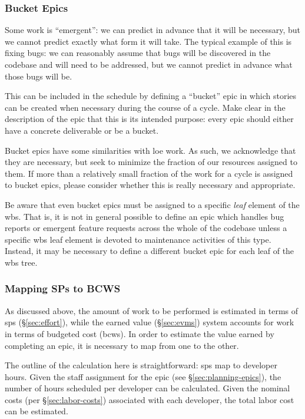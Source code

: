 \subsubsection{Bucket Epics}
\label{sec:bucket}

Some work is ``emergent'': we can predict in advance that it will be necessary, but we cannot predict exactly what form it will take.
The typical example of this is fixing bugs: we can reasonably assume that bugs will be discovered in the codebase and will need to be addressed, but we cannot predict in advance what those bugs will be.

This can be included in the schedule by defining a ``bucket'' \gls{epic} in which stories can be created when necessary during the course of a \gls{cycle}.
Make clear in the description of the \gls{epic} that this is its intended purpose: every \gls{epic} should either have a concrete deliverable or be a bucket.

Bucket \glspl{epic} have some similarities with \gls{loe} work.
As such, we acknowledge that they are necessary, but seek to minimize the fraction of our resources assigned to them.
If more than a relatively small fraction of the work for a \gls{cycle} is assigned to bucket \glspl{epic}, please consider whether this is really necessary and appropriate.

Be aware that even bucket \glspl{epic} must be assigned to a specific \emph{leaf} \gls{element} of the \gls{wbs}.
That is, it is not in general possible to define an \gls{epic} which handles bug reports or emergent feature requests across the whole of the codebase unless a specific \gls{wbs} leaf \gls{element} is devoted to maintenance activities of this type.
Instead, it may be necessary to define a different bucket \gls{epic} for each leaf of the \gls{wbs} tree.

\subsubsection{Mapping SPs to BCWS}
\label{sec:sps-to-bcws}

As discussed above, the amount of work to be performed is estimated in terms of \glspl{sp} (\S\ref{sec:effort}), while the earned value (\S\ref{sec:evms}) system accounts for work in terms of budgeted cost (\gls{bcws}).
In order to estimate the value earned by completing an \gls{epic}, it is necessary to map from one to the other.

The outline of the calculation here is straightforward: \glspl{sp} map to developer hours.
Given the staff assignment for the \gls{epic} (see \S\ref{sec:planning-epics}), the number of hours scheduled per developer can be calculated.
Given the nominal costs (per \S\ref{sec:labor-costs}) associated with each developer, the total labor cost can be estimated.

